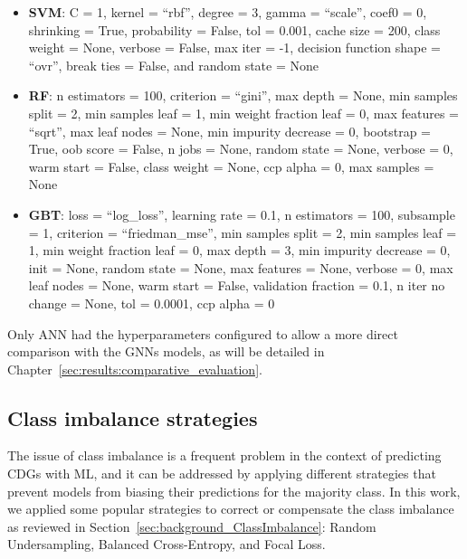 \begin{itemize}
    \item \textbf{SVM}: C = 1, kernel = ``rbf'', degree = 3, gamma = ``scale'', coef0 = 0, shrinking = True, probability = False, tol = 0.001, cache size = 200, class weight = None, verbose = False, max iter = -1, decision function shape = ``ovr'', break ties = False, and random state = None

    \item \textbf{RF}: n estimators = 100, criterion = ``gini'', max depth = None, min samples split = 2, min samples leaf = 1, min weight fraction leaf = 0, max features = ``sqrt'', max leaf nodes = None, min impurity decrease = 0, bootstrap = True, oob score = False, n jobs = None, random state = None, verbose = 0, warm start = False, class weight = None, ccp alpha = 0, max samples = None

    \item \textbf{GBT}: loss = ``log\_loss'', learning rate = 0.1, n estimators = 100, subsample = 1, criterion = ``friedman\_mse'', min samples split = 2, min samples leaf = 1, min weight fraction leaf = 0, max depth = 3, min impurity decrease = 0, init = None, random state = None, max features = None, verbose = 0, max leaf nodes = None, warm start = False, validation fraction = 0.1, n iter no change = None, tol = 0.0001, ccp alpha = 0
    
\end{itemize}



Only ANN had the  hyperparameters configured to allow a more direct comparison with the GNNs models, as will be detailed in Chapter~\ref{sec:results:comparative_evaluation}.



\subsection{Class imbalance strategies}

The issue of class imbalance is a frequent problem in the context of predicting CDGs with ML, and it can be addressed by applying different strategies that prevent models from biasing their predictions for the majority class. In this work, we applied some popular strategies to correct or compensate the class imbalance as reviewed in Section~\ref{sec:background_ClassImbalance}: Random Undersampling, Balanced Cross-Entropy, and Focal Loss. 

